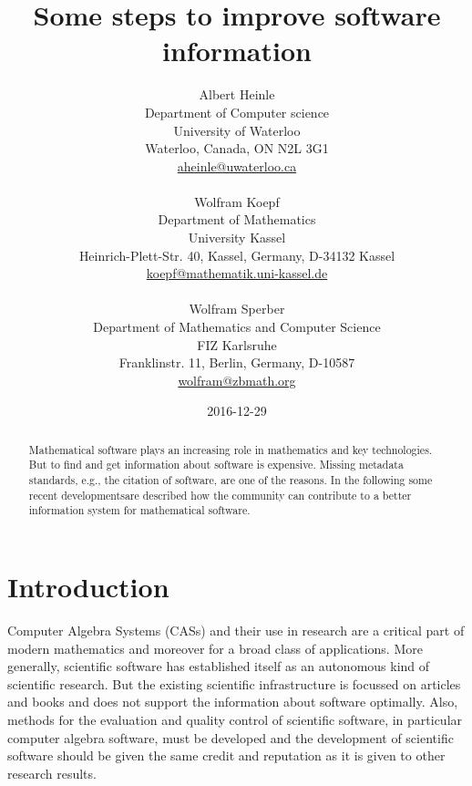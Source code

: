 \documentclass[12pt]{article}
\begin{document}
\title{Some steps to improve software information}

\author{Albert Heinle\\
  Department of Computer science\\
  University of Waterloo\\
  Waterloo, Canada,  ON N2L 3G1\\
  \url{aheinle@uwaterloo.ca}\\
  \\
  Wolfram Koepf\\
  Department of Mathematics\\
  University Kassel\\
  Heinrich-Plett-Str. 40, Kassel, Germany, D-34132 Kassel\\
  \url{koepf@mathematik.uni-kassel.de}\\
  \\
  Wolfram Sperber\\
  Department of Mathematics and Computer Science\\
  FIZ Karlsruhe\\
  Franklinstr. 11, Berlin, Germany, D-10587\\
  \url{wolfram@zbmath.org}}    

\date{2016-12-29}

\maketitle


\begin{abstract}
Mathematical software plays an increasing role in mathematics and key technologies. But to find and get information about software is expensive. Missing metadata standards, e.g., the citation of software,  are one of the reasons. In the following some recent developmentsare described how the community can contribute to a better information system for mathematical software.    
\end{abstract}

\section{Introduction}

Computer Algebra Systems (CASs) and their use in research are a critical part of modern mathematics and more\-over for a broad class of applications. More generally, scientific software has established itself as an autonomous kind of scientific research. But the existing scientific infrastructure is focussed on articles and books and does not support the information about software optimally. Also, methods for the evaluation and quality control of scientific software, in particular computer algebra software, must be developed and the development of scientific software should be given the same credit and reputation as it is given to other research results.
\end{document}
